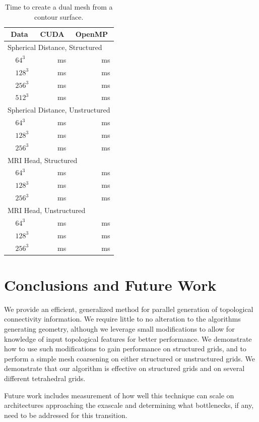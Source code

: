 \documentclass[10pt,journal,cspaper,compsoc]{IEEEtran}
\begin{document}
\begin{table}[htb]
  \centering
  \caption{Time to create a dual mesh from a contour surface.}
  \label{table:DualMesh}
  \begin{tabular}{l l r r}
    \multicolumn{2}{c}{Data}
    & \multicolumn{1}{c}{CUDA}
    & \multicolumn{1}{c}{OpenMP} \\
    \hline
    \multicolumn{4}{l}{Spherical Distance, Structured} \\
    \quad
    & $64^3$ &  ms &  ms \\
    & $128^3$ &  ms &  ms \\
    & $256^3$ &  ms &  ms \\
    & $512^3$ &  ms &  ms \\
    \multicolumn{4}{l}{Spherical Distance, Unstructured} \\
    & $64^3$ &  ms &  ms \\
    & $128^3$ &  ms &  ms \\
    & $256^3$ &  ms &  ms \\
    \multicolumn{4}{l}{MRI Head, Structured} \\
    & $64^3$ &  ms &  ms \\
    & $128^3$ &  ms &  ms \\
    & $256^3$ &  ms &  ms \\
    \multicolumn{4}{l}{MRI Head, Unstructured} \\
    & $64^3$ &  ms &  ms \\
    & $128^3$ &  ms &  ms \\
    & $256^3$ &  ms &  ms
  \end{tabular}
\end{table}

\section{Conclusions and Future Work}
We provide an efficient, generalized method for parallel generation of topological connectivity information. We require little to no alteration to the algorithms generating geometry, although we leverage small modifications to allow for knowledge of input topological features for better performance. We demonstrate how to use such modifications to gain performance on structured grids, and to perform a simple mesh coarsening on either structured or unstructured grids. We demonstrate that our algorithm is effective on structured grids and on several different tetrahedral grids. 

Future work includes measurement of how well this technique can scale on architectures approaching the exascale and determining what bottlenecks, if any, need to be addressed for this transition. 
\end{document}
